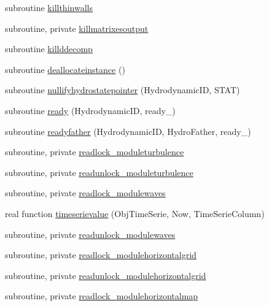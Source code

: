 \begin{DoxyCompactItemize}
\item 
subroutine \mbox{\hyperlink{namespacemodulehydrodynamic_a93dc7bf3dc53936a78e774fea543f5d9}{killthinwalls}}
\item 
subroutine, private \mbox{\hyperlink{namespacemodulehydrodynamic_a8a24bb3b15a1b676c23a6ecd0a1defa8}{killmatrixesoutput}}
\item 
subroutine \mbox{\hyperlink{namespacemodulehydrodynamic_afcb6ada5d2c8c5ce856cc9efcbb38077}{killddecomp}}
\item 
subroutine \mbox{\hyperlink{namespacemodulehydrodynamic_aabd13dda5e1f35caf879873becb922c4}{deallocateinstance}} ()
\item 
subroutine \mbox{\hyperlink{namespacemodulehydrodynamic_a3c9ae88187f7c83938a730ba2aecc5b4}{nullifyhydrostatepointer}} (Hydrodynamic\+ID, S\+T\+AT)
\item 
subroutine \mbox{\hyperlink{namespacemodulehydrodynamic_a541821548a44af36e71f5eddedae890e}{ready}} (Hydrodynamic\+ID, ready\+\_\+)
\item 
subroutine \mbox{\hyperlink{namespacemodulehydrodynamic_a3590684b189672df14d8ed25dc6e6156}{readyfather}} (Hydrodynamic\+ID, Hydro\+Father, ready\+\_\+)
\item 
subroutine, private \mbox{\hyperlink{namespacemodulehydrodynamic_aca47e0fe75006cf9be3be10af982ba2c}{readlock\+\_\+moduleturbulence}}
\item 
subroutine, private \mbox{\hyperlink{namespacemodulehydrodynamic_a894329be6f1d95af1f87b82950558271}{readunlock\+\_\+moduleturbulence}}
\item 
subroutine, private \mbox{\hyperlink{namespacemodulehydrodynamic_af607bb807c6d67a54a48586646880d77}{readlock\+\_\+modulewaves}}
\item 
real function \mbox{\hyperlink{namespacemodulehydrodynamic_a5ac5205b827b25fab464de95d2c838bf}{timeserievalue}} (Obj\+Time\+Serie, Now, Time\+Serie\+Column)
\item 
subroutine, private \mbox{\hyperlink{namespacemodulehydrodynamic_a652c0bf5742de7f1bc1ccdd771297bbc}{readunlock\+\_\+modulewaves}}
\item 
subroutine, private \mbox{\hyperlink{namespacemodulehydrodynamic_a87327c743a7173e47122b62474c77ea7}{readlock\+\_\+modulehorizontalgrid}}
\item 
subroutine, private \mbox{\hyperlink{namespacemodulehydrodynamic_aaf0ec07ca1129c3b8498e92e10e49f10}{readunlock\+\_\+modulehorizontalgrid}}
\item 
subroutine, private \mbox{\hyperlink{namespacemodulehydrodynamic_a2b7951ef8d3385a7141d22cbca764a93}{readlock\+\_\+modulehorizontalmap}}

\end{DoxyCompactItemize}

